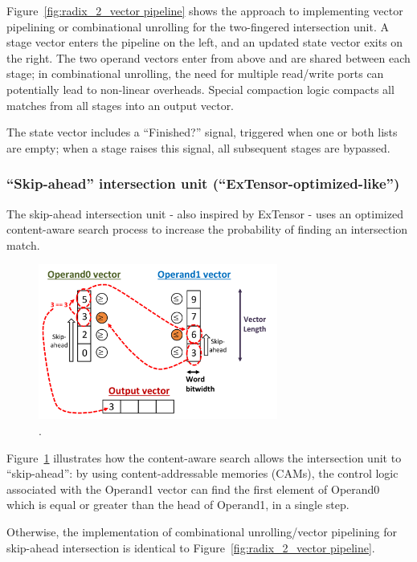 Figure~\ref{fig:radix_2_vector pipeline} shows the approach to implementing vector pipelining or combinational unrolling for the two-fingered intersection unit. A stage vector enters the pipeline on the left, and an updated state vector exits on the right. The two operand vectors enter from above and are shared between each stage; in combinational unrolling, the need for multiple read/write ports can potentially lead to non-linear overheads. Special compaction logic compacts all matches from all stages into an output vector.

The state vector includes a ``Finished?'' signal, triggered when one or both lists are empty; when a stage raises this signal, all subsequent stages are bypassed.

\subsubsection{``Skip-ahead'' intersection unit (``ExTensor-optimized-like'')}

The skip-ahead intersection unit - also inspired by ExTensor\cite{extensor} - uses an optimized content-aware search process to increase the probability of finding an intersection match.

\begin{figure}[ht]
\centering
\includegraphics[width=0.7\textwidth]{figures/skip_ahead_dia.pdf}
\caption{.}
\label{fig:skip_ahead_dia}
\end{figure}

Figure~\ref{fig:skip_ahead_dia} illustrates how the content-aware search allows the intersection unit to ``skip-ahead'': by using content-addressable memories (CAMs), the control logic associated with the Operand1 vector can find the first element of Operand0 which is equal or greater than the head of Operand1, in a single step. 

Otherwise, the implementation of combinational unrolling/vector pipelining for skip-ahead intersection is identical to Figure~\ref{fig:radix_2_vector pipeline}.

